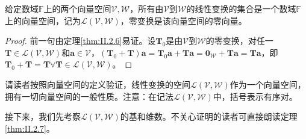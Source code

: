 \documentclass[main.tex]{subfiles}
\begin{document}
\begin{corollary}
    给定数域$\mathbb{F}$上的两个向量空间$\mathcal{V},\mathcal{W}$，所有由$\mathcal{V}$到$\mathcal{W}$的线性变换的集合是一个数域$\mathbb{F}$上的向量空间，记为$\mathcal{L}\left(\mathcal{V},\mathcal{W}\right)$，零变换是该向量空间的零向量。
\end{corollary}
\begin{proof}
    前一句由定理\ref{thm:II.2.6}易证。设$\mathbf{T}_0$是由$\mathcal{V}$到$\mathcal{W}$的零变换，对任一$\mathbf{T}\in\mathcal{L}\left(\mathcal{V},\mathcal{W}\right)$和$\mathbf{a}\in\mathcal{V}$，$\left(\mathbf{T}_0+\mathbf{T}\right)\mathbf{a}=\mathbf{T}_0\mathbf{a}+\mathbf{Ta}=\mathbf{0}_\mathcal{W}+\mathbf{Ta}=\mathbf{Ta}$，即$\mathbf{T}_0+\mathbf{T}=\mathbf{T}\forall\mathbf{T}\in\mathcal{L}\left(\mathcal{V},\mathcal{W}\right)$。
\end{proof}

请读者按照向量空间的定义验证，线性变换的空间$\mathcal{L}\left(\mathcal{V},\mathcal{W}\right)$作为一个向量空间，拥有一切向量空间的一般性质。注意：在记法$\mathcal{L}\left(\mathcal{V},\mathcal{W}\right)$中，括号表示有序对。

接下来，我们先考察$\mathcal{L}\left(\mathcal{V},\mathcal{W}\right)$的基和维数。不关心证明的读者可直接朗读定理\ref{thm:II.2.7}。
\end{document}
